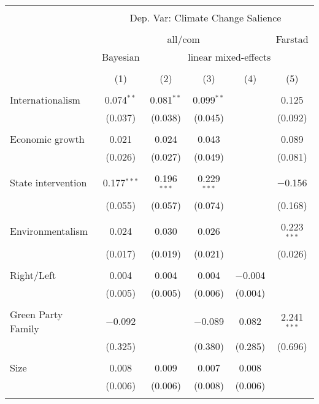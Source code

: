 
\begin{tabular}{@{\extracolsep{5pt}}lccccc} 
\\[-1.8ex]\hline 
\hline \\[-1.8ex] 
 & \multicolumn{5}{c}{Dep. Var: Climate Change Salience} \\ 
\cline{2-6} 
\\[-1.8ex] & \multicolumn{4}{c}{all/com} & Farstad \\ 
 & Bayesian & \multicolumn{4}{c}{linear mixed-effects} \\ 
\\[-1.8ex] & (1) & (2) & (3) & (4) & (5)\\ 
\hline \\[-1.8ex] 
 Internationalism & 0.074$^{**}$ & 0.081$^{**}$ & 0.099$^{**}$ &  & 0.125 \\ 
  & (0.037) & (0.038) & (0.045) &  & (0.092) \\ 
  & & & & & \\ 
 Economic growth & 0.021 & 0.024 & 0.043 &  & 0.089 \\ 
  & (0.026) & (0.027) & (0.049) &  & (0.081) \\ 
  & & & & & \\ 
 State intervention & 0.177$^{***}$ & 0.196$^{***}$ & 0.229$^{***}$ &  & $-$0.156 \\ 
  & (0.055) & (0.057) & (0.074) &  & (0.168) \\ 
  & & & & & \\ 
 Environmentalism & 0.024 & 0.030 & 0.026 &  & 0.223$^{***}$ \\ 
  & (0.017) & (0.019) & (0.021) &  & (0.026) \\ 
  & & & & & \\ 
 Right/Left & 0.004 & 0.004 & 0.004 & $-$0.004 &  \\ 
  & (0.005) & (0.005) & (0.006) & (0.004) &  \\ 
  & & & & & \\ 
 Green Party Family & $-$0.092 &  & $-$0.089 & 0.082 & 2.241$^{***}$ \\ 
  & (0.325) &  & (0.380) & (0.285) & (0.696) \\ 
  & & & & & \\ 
 Size & 0.008 & 0.009 & 0.007 & 0.008 &  \\ 
  & (0.006) & (0.006) & (0.008) & (0.006) &  \\ 
  & & & & & \\ 

\end{tabular}
